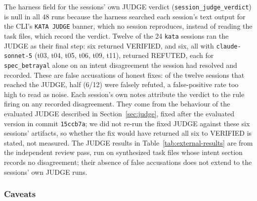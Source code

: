 \documentclass[11pt]{article}
\begin{document}
The harness field for the sessions' own JUDGE verdict
(\texttt{session\_judge\_verdict}) is null in all 48 runs because the harness
searched each session's text output for the CLI's \texttt{KATA JUDGE}
banner, which no session reproduces, instead of
reading the task files, which record the verdict. Twelve of the 24
\texttt{kata} sessions ran the JUDGE as their final step: six returned
VERIFIED, and six, all with \texttt{claude-sonnet-5} (t03, t04, t05, t06, t09,
t11), returned REFUTED, each for \texttt{spec\_betrayal} alone on an intent
disagreement the session had resolved and recorded. These are false
accusations of honest fixes: of the twelve sessions that reached the JUDGE,
half (6/12) were falsely refuted, a false-positive rate too high to read as
noise. Each session's own notes attribute the
verdict to the rule firing on any recorded disagreement. They come from the
behaviour of the evaluated JUDGE described in Section~\ref{sec:judge}, fixed
after the evaluated version in commit \texttt{15ccb7a}; we did not re-run
the fixed JUDGE against these six sessions' artifacts, so whether the fix
would have returned all six to VERIFIED is stated, not measured. The JUDGE results in
Table~\ref{tab:external-results} are from the independent review pass, run on
synthesized task files whose intent section records no disagreement; their
absence of false accusations does not extend to the sessions' own JUDGE
runs.

\subsubsection{Caveats}
\end{document}
